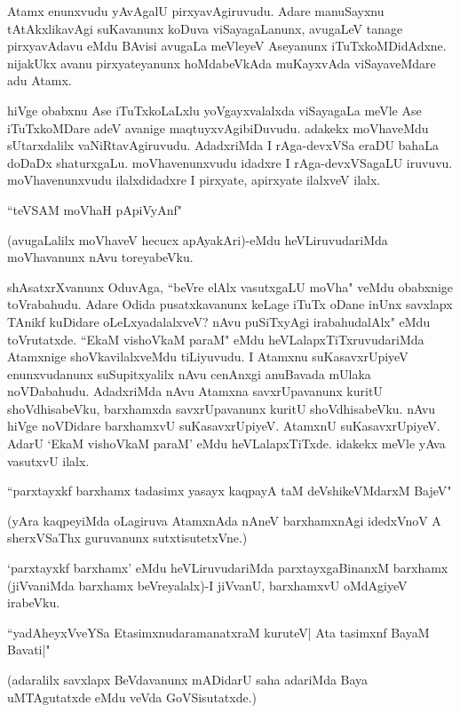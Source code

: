 Atamx enunxvudu yAvAgalU pirxyavAgiruvudu. Adare manuSayxnu tAtAkxlikavAgi suKavanunx koDuva viSayagaLanunx, avugaLeV tanage pirxyavAdavu eMdu BAvisi avugaLa meVleyeV Aseyanunx iTuTxkoMDidAdxne. nijakUkx avanu pirxyateyanunx hoMdabeVkAda muKayxvAda viSayaveMdare adu Atamx.

hiVge obabxnu Ase iTuTxkoLaLxlu yoVgayxvalalxda viSayagaLa meVle Ase iTuTxkoMDare adeV avanige maqtuyxvAgibiDuvudu. adakekx moVhaveMdu sUtarxdalilx vaNiRtavAgiruvudu. AdadxriMda I rAga-devxVSa eraDU bahaLa doDaDx shaturxgaLu. moVhavenunxvudu idadxre I rAga-devxVSagaLU iruvuvu. moVhavenunxvudu ilalxdidadxre I pirxyate, apirxyate ilalxveV ilalx.

\begin{shloka}
``teVSAM moVhaH pApiVyAnf"
\end{shloka}

(avugaLalilx moVhaveV hecucx apAyakAri)-eMdu heVLiruvudariMda moVhavanunx nAvu toreyabeVku.

shAsatxrXvanunx OduvAga, ``beVre elAlx vasutxgaLU moVha" veMdu obabxnige toVrabahudu. Adare Odida pusatxkavanunx keLage iTuTx oDane inUnx savxlapx TAnikf kuDidare oLeLxyadalalxveV? nAvu puSiTxyAgi irabahudalAlx" eMdu toVrutatxde. ``EkaM vishoVkaM paraM" eMdu heVLalapxTiTxruvudariMda Atamxnige shoVkavilalxveMdu tiLiyuvudu. I Atamxnu suKasavxrUpiyeV enunxvudanunx suSupitxyalilx nAvu cenAnxgi anuBavada mUlaka noVDabahudu. AdadxriMda nAvu Atamxna savxrUpavanunx kuritU shoVdhisabeVku, barxhamxda savxrUpavanunx kuritU shoVdhisabeVku. nAvu hiVge noVDidare barxhamxvU suKasavxrUpiyeV. AtamxnU suKasavxrUpiyeV. AdarU `EkaM vishoVkaM paraM' eMdu heVLalapxTiTxde. idakekx meVle yAva vasutxvU ilalx.

\begin{shloka}
``parxtayxkf barxhamx tadasimx yasayx kaqpayA taM deVshikeVMdarxM BajeV"
\end{shloka}

(yAra kaqpeyiMda oLagiruva AtamxnAda nAneV barxhamxnAgi idedxVnoV A sherxVSaThx guruvanunx sutxtisutetxVne.)

`parxtayxkf barxhamx' eMdu heVLiruvudariMda parxtayxgaBinanxM barxhamx (jiVvaniMda barxhamx beVreyalalx)-I jiVvanU, barxhamxvU oMdAgiyeV irabeVku.

\begin{shloka}
``yadAheyxVveYSa EtasimxnudaramanatxraM kuruteV| Ata tasimxnf BayaM Bavati|"
\end{shloka}

(adaralilx savxlapx BeVdavanunx mADidarU saha adariMda Baya uMTAgutatxde eMdu veVda GoVSisutatxde.)

